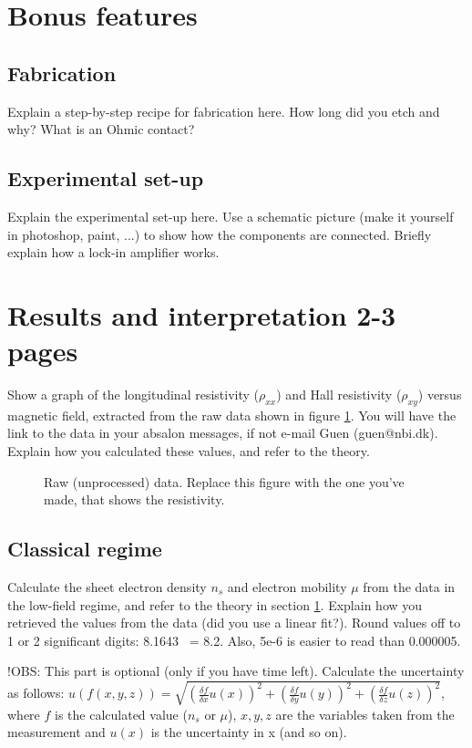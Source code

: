 \documentclass[a4paper]{article}
\begin{document}
\section{Bonus features}
\label{sec:bonus}
\subsection{Fabrication}
Explain a step-by-step recipe for fabrication here. How long did you etch and why? What is an Ohmic contact?
\subsection{Experimental set-up}
Explain the experimental set-up here. Use a schematic picture (make it yourself in photoshop, paint, ...) to show how the components are connected. Briefly explain how a lock-in amplifier works.
      
\newpage
\section{Results and interpretation 2-3 pages}
Show a graph of the longitudinal resistivity ($\rho_{xx}$) and Hall resistivity ($\rho_{xy}$) versus magnetic field, extracted from the raw data shown in figure \ref{fig:data}. You will have the link to the data in your absalon messages, if not e-mail Guen (guen@nbi.dk). Explain how you calculated these values, and refer to the theory.
      
\begin{figure}
	\centering
	\caption{\label{fig:data}Raw (unprocessed) data. Replace this figure with the one you've made, that shows the resistivity.}
\end{figure}
      
\subsection{Classical regime}
Calculate the sheet electron density $n_{s}$ and electron mobility $\mu$ from the data in the low-field regime, and refer to the theory in section \ref{sec:bonus}. Explain how you retrieved the values from the data (did you use a linear fit?).
Round values off to 1 or 2 significant digits: 8.1643 ~= 8.2. Also, 5e-6 is easier to read than 0.000005.
      
!OBS: This part is optional (only if you have time left).
Calculate the uncertainty as follows: \newline $u(f(x, y, z)) = \sqrt{(\frac{\delta f}{\delta{x}} u(x))^{2} + (\frac{\delta f}{\delta{y}} u(y))^{2} + (\frac{\delta f}{\delta{z}} u(z))^{2}}$, where $f$ is the calculated value ($n_{s}$ or $\mu$), $x, y, z$ are the variables taken from the measurement and $u(x)$ is the uncertainty in x (and so on).
      
\end{document}
